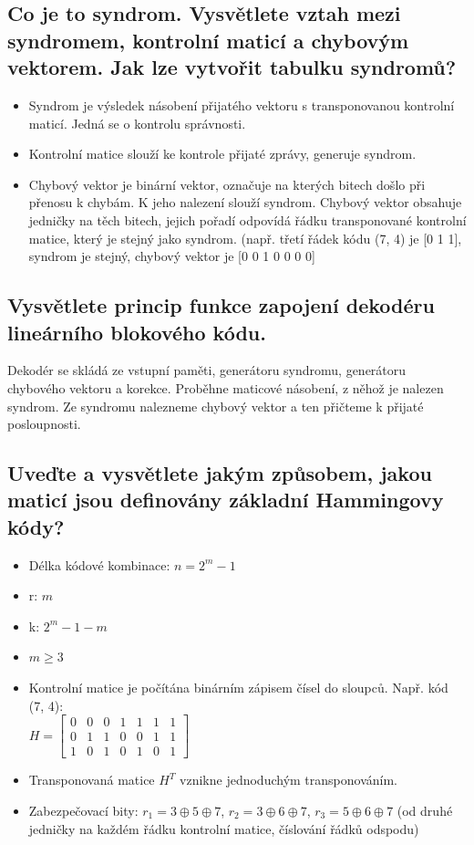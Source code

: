 \subsection{Co je to syndrom. Vysvětlete vztah mezi syndromem, kontrolní maticí a chybovým
vektorem. Jak lze vytvořit tabulku syndromů?}
\begin{itemize}
    \item Syndrom je výsledek násobení přijatého vektoru s transponovanou kontrolní maticí. 
    Jedná se o kontrolu správnosti.
    \item Kontrolní matice slouží ke kontrole přijaté zprávy, generuje syndrom.
    \item Chybový vektor je binární vektor, označuje na kterých bitech došlo při přenosu k chybám. K jeho 
    nalezení slouží syndrom. Chybový vektor obsahuje jedničky na těch bitech, jejich pořadí odpovídá řádku transponované
    kontrolní matice, který je stejný jako syndrom. (např. třetí řádek kódu (7, 4) je [0 1 1], syndrom je stejný,
    chybový vektor je [0 0 1 0 0 0 0]
\end{itemize}

\subsection{Vysvětlete princip funkce zapojení dekodéru lineárního blokového kódu.}
Dekodér se skládá ze vstupní paměti, generátoru syndromu, generátoru chybového vektoru a korekce. Proběhne
maticové násobení, z něhož je nalezen syndrom. Ze syndromu nalezneme chybový vektor a ten přičteme 
k přijaté posloupnosti.

\subsection{Uveďte a vysvětlete jakým způsobem, jakou maticí jsou definovány základní Hammingovy kódy?}
\begin{itemize}
    \item Délka kódové kombinace: $n=2^m-1$
    \item r: $m$
    \item k: $2^m-1-m$
    \item $m \geq 3$
    \item Kontrolní matice je počítána binárním zápisem čísel do sloupců. Např. kód (7, 4):\\
    $H=\left[\begin{array}{ccccccc}
        0 & 0 & 0 & 1 & 1 & 1 & 1 \\
        0 & 1 & 1 & 0 & 0 & 1 & 1 \\
        1 & 0 & 1 & 0 & 1 & 0 & 1
    \end{array}
    \right]$
    \item Transponovaná matice $H^T$ vznikne jednoduchým transponováním.
    \item Zabezpečovací bity: $r_1 = 3 \oplus 5 \oplus7$, $r_2 = 3 \oplus 6 \oplus 7$,
    $r_3 = 5 \oplus 6 \oplus 7$ (od druhé jedničky na každém řádku kontrolní matice, číslování řádků odspodu)
\end{itemize}

